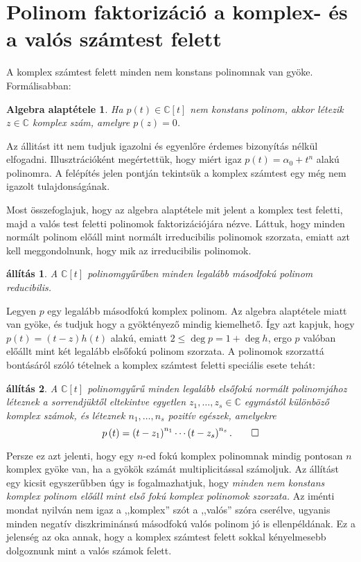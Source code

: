 \documentclass[9pt, showtrims]{memoir}
\makeatletter
\renewenvironment{proof}[1][\proofname]
    {\par\pushQED{\qed}%
    \normalfont \topsep6\p@\@plus6\p@\relax
    \trivlist
    \item[\hskip\labelsep
        \itshape
    #1\@addpunct{:}]\ignorespaces}
    {\popQED\endtrivlist\@endpefalse}
\theoremstyle{plain}
\newtheorem{proposition}{állítás}[section]
\newtheorem*{FA}{Algebra alaptétele}
\theoremstyle{remark}
\theoremstyle{definition}
\makeatother
\begin{document}
\section{Polinom faktorizáció a komplex- és a valós számtest felett}
A komplex számtest felett minden nem konstans polinomnak van gyöke.
Formálisabban:
\begin{FA}
    Ha $p\left( t \right)\in\mathbb{C}[t]$ nem konstans polinom,
    akkor létezik $z\in\mathbb{C}$ komplex szám, 
    amelyre $p\left( z \right)=0$.
\end{FA}
Az állitást itt nem tudjuk igazolni és egyenlőre érdemes bizonyítás nélkül elfogadni.
Illusztrációként megértettük, hogy miért igaz $p\left( t \right)=\alpha_0+t^n$ alakú polinomra.
A felépítés jelen pontján tekintsük a komplex számtest egy még nem igazolt tulajdonságának.

Most összefoglajuk, hogy az algebra alaptétele mit jelent a komplex test feletti, majd a valós test feletti polinomok
faktorizációjára nézve.
Láttuk, hogy minden normált polinom előáll mint normált irreducibilis polinomok szorzata,
emiatt azt kell meggondolnunk, hogy mik az irreducibilis polinomok.
\begin{proposition}
    A $\mathbb{C}\left[ t \right]$ polinomgyűrűben minden legalább másodfokú polinom reducibilis.
\end{proposition}
\begin{proof}
    Legyen $p$ egy legalább másodfokú komplex polinom.
    Az algebra alaptétele miatt van gyöke, és
    tudjuk hogy a gyöktényező mindig kiemelhető.
    Így azt kapjuk, hogy $p(t)=\left( t-z \right)h\left( t \right)$ alakú,
    emiatt $2\leq\deg p=1+\deg h$, ergo
    $p$ valóban előállt mint két legalább elsőfokú polinom szorzata.
\end{proof}
A polinomok szorzattá bontásáról szóló tételnek a komplex számtest feletti speciális esete tehát:
\begin{proposition}\label{pr:PolFact}
    A $\mathbb{C}[t]$ polinomgyűrű minden legalább elsőfokú normált polinomjához léteznek
    a sorrendjüktől eltekintve egyetlen $z_1,\dots,z_s\in\mathbb{C}$ egymástól különböző komplex számok,
    és léteznek $n_1,\dots,n_s$ pozitív egészek, 
    amelyekre
    \[
        p\left( t \right)=
        \left( t-z_1 \right)^{n_1}
        \cdots
        \left( t-z_s\right)^{n_s}.\qedhere
    \]
\end{proposition}
Persze ez azt jelenti, hogy egy $n$-ed fokú komplex polinomnak mindig pontosan $n$ komplex gyöke van, 
ha a gyökök számát multiplicitással számoljuk.
Az állítást egy kicsit egyszerűbben úgy is fogalmazhatjuk, 
hogy 
\emph{
    minden nem konstans komplex polinom előáll mint első fokú komplex polinomok szorzata.
}
Az iménti mondat nyilván nem igaz a ,,komplex'' szót a ,,valós'' szóra cserélve, 
ugyanis minden negatív diszkriminánsú másodfokú valós polinom jó is ellenpéldának.
Ez a jelenség az oka annak, 
hogy a komplex számtest felett sokkal kényelmesebb dolgoznunk mint a valós számok felett.
\end{document}
